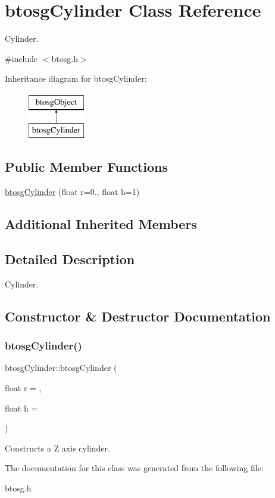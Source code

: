 \hypertarget{classbtosgCylinder}{}\section{btosg\+Cylinder Class Reference}
\label{classbtosgCylinder}


Cylinder.  




{\ttfamily \#include $<$btosg.\+h$>$}

Inheritance diagram for btosg\+Cylinder\+:\begin{figure}[H]
\begin{center}
\leavevmode
\includegraphics[height=2.000000cm]{classbtosgCylinder}
\end{center}
\end{figure}
\subsection*{Public Member Functions}
\begin{DoxyCompactItemize}
\item 
\hyperlink{classbtosgCylinder_a85e2517d8fd8a16ad7514f2f70cc1086}{btosg\+Cylinder} (float r=0., float h=1)
\end{DoxyCompactItemize}
\subsection*{Additional Inherited Members}


\subsection{Detailed Description}
Cylinder. 

\subsection{Constructor \& Destructor Documentation}
\mbox{\label{classbtosgCylinder_a85e2517d8fd8a16ad7514f2f70cc1086}} 
\subsubsection{\texorpdfstring{btosg\+Cylinder()}{btosgCylinder()}}
{\footnotesize\ttfamily btosg\+Cylinder\+::btosg\+Cylinder (\begin{DoxyParamCaption}\item[{float}]{r = {},  }\item[{float}]{h = {} }\end{DoxyParamCaption})\hspace{0.3cm}{\ttfamily [inline]}}

Constructs a Z axis cylinder. 

The documentation for this class was generated from the following file\+:\begin{DoxyCompactItemize}
\item 
btosg.\+h\end{DoxyCompactItemize}
